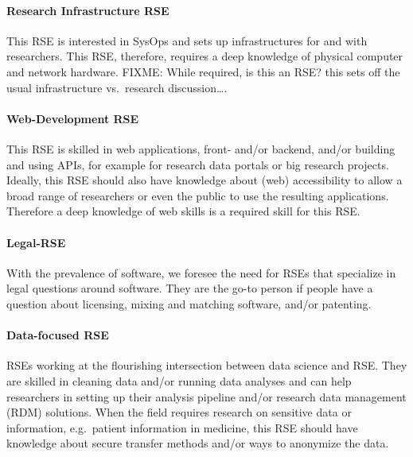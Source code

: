 \documentclass[a4paper
]{article}
\begin{document}
\hypertarget{research-infrastructure-rse}{%
\paragraph{Research Infrastructure
RSE}\label{research-infrastructure-rse}}

This RSE is interested in SysOps and sets up infrastructures for and
with researchers. This RSE, therefore, requires a deep knowledge of
physical computer and network hardware. FIXME: While required, is this
an RSE? this sets off the usual infrastructure vs.~research
discussion\ldots.

\hypertarget{web-development-rse}{%
\paragraph{Web-Development RSE}\label{web-development-rse}}

This RSE is skilled in web applications, front- and/or backend, and/or
building and using APIs, for example for research data portals or big
research projects. Ideally, this RSE should also have knowledge about
(web) accessibility to allow a broad range of researchers or even the
public to use the resulting applications. Therefore a deep knowledge of
web skills is a required skill for this RSE.

\hypertarget{legal-rse}{%
\paragraph{Legal-RSE}\label{legal-rse}}

With the prevalence of software, we foresee the need for RSEs that
specialize in legal questions around software. They are the go-to person
if people have a question about licensing, mixing and matching software,
and/or patenting.

\hypertarget{data-focused-rse}{%
\paragraph{Data-focused RSE}\label{data-focused-rse}}

RSEs working at the flourishing intersection between data science and
RSE. They are skilled in cleaning data and/or running data analyses and
can help researchers in setting up their analysis pipeline and/or
research data management (RDM) solutions. When the field requires
research on sensitive data or information, e.g.~patient information in
medicine, this RSE should have knowledge about secure transfer methods
and/or ways to anonymize the data.
\end{document}
